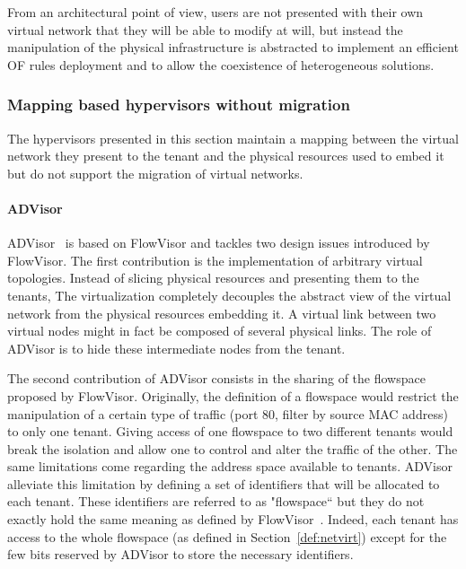 From an architectural point of view, users are not presented with their own virtual network that they will be able to modify at will, but instead the manipulation of the physical infrastructure is abstracted to implement an efficient OF rules deployment and to allow the coexistence of heterogeneous solutions.


\subsubsection{Mapping based hypervisors without migration}
The hypervisors presented in this section maintain a mapping between the virtual network they present to the tenant and the physical resources used to embed it but do not support the migration of virtual networks.

\paragraph{ADVisor}
ADVisor~\cite{ADVisor-Salvadori2012} is based on FlowVisor and tackles two design issues introduced by FlowVisor.
The first contribution is the implementation of arbitrary virtual topologies.
Instead of slicing physical resources and presenting them to the tenants, 
The virtualization completely decouples the abstract view of the virtual network from the physical resources embedding it.
A virtual link between two virtual nodes might in fact be composed of several physical links. The role of ADVisor is to hide these intermediate nodes from the tenant.

The second contribution of ADVisor consists in the sharing of the flowspace proposed by FlowVisor.
Originally, the definition of a flowspace would restrict the manipulation of a certain type of traffic (\eg port 80, filter by source MAC address) to only one tenant.
Giving access of one flowspace to two different tenants would break the isolation and allow one to control and alter the traffic of the other.
The same limitations come regarding the address space available to tenants.
ADVisor alleviate this limitation by defining a set of identifiers that will be allocated to each tenant. These identifiers are referred to as "flowspace`` but they do not exactly hold the same meaning as defined by FlowVisor~\cite{FlowVisor-Sherwood2009}. Indeed, each tenant has access to the whole flowspace (as defined in Section~\ref{def:netvirt}) except for the few bits reserved by ADVisor to store the necessary identifiers.

